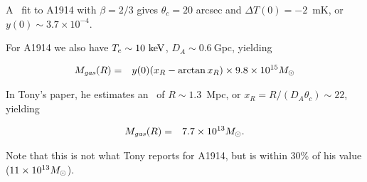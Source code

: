 A \betamodel\ fit to A1914 with $\beta = 2/3$ gives $\theta_c = 20$ arcsec and $\Delta T(0) = -2$~mK, or $y(0) \sim 3.7\times 10^{-4}$.  

For A1914 we also have $T_e \sim 10~{\rm keV}$, $D_A \sim 0.6~$Gpc,
yielding

\begin{eqnarray}
M_{\it gas}(R) &=& y(0) ({x_R - \arctan{x_R}}) \times 9.8\times 10^{15}M_{\odot}
\end{eqnarray}

In Tony's paper, he estimates an \ of $R \sim 1.3$~Mpc, or $x_R = R/(D_A\theta_c) \sim 22$, yielding

\begin{eqnarray}
M_{\it gas}(R) &=& 7.7\times 10^{13}M_{\odot}.
\end{eqnarray}

Note that this is not what Tony reports for A1914, but is within 30\% of his value ($11\times 10^{13}M_{\odot}$).
